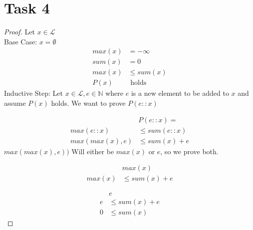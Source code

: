 \documentclass{article}
\begin{document}
	\newpage
	\section{Task 4}
	\begin{proof}
		Let $x \in \mathcal{L}$ \\
		Base Case: 
		$x = \emptyset$
		\begin{align*}
			max(x) &= -\infty \\
			sum(x) &= 0 \\
			max(x) &\leq sum(x) \\ 
			P(x) &\text{  holds} 
		\end{align*}
		\noindent Inductive Step:
		Let $x \in \mathcal{L}, e \in \mathbb{N}$ where $e$ is a new element to be added to $x$ and assume $P(x)$ holds. We want to prove $P(e::x)$
		
		\begin{align*}
			&P(e::x) = \\
			max(e::x) &\leq sum(e::x) \\
			max(max(x), e) &\leq sum(x) + e
		\end{align*}
		$max(max(x),e))$ Will either be $max(x)$ or $e$, so we prove both.
		
		\begin{align*}
			&max(x) \\
			max(x) &\leq sum(x) + e
		\end{align*}
		
		\begin{align*}
			&e \\
			e &\leq sum(x) + e \\
			0 &\leq sum(x)
		\end{align*}
	\end{proof}
\end{document}
